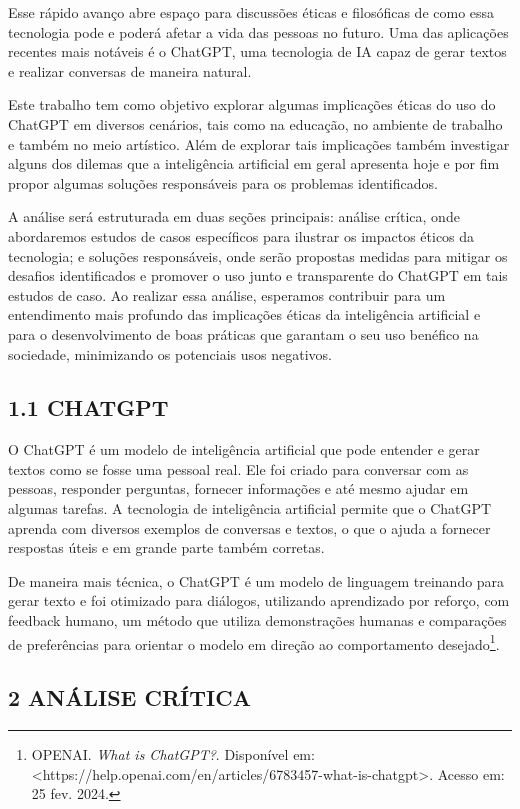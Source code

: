 Esse rápido avanço abre espaço para discussões éticas e filosóficas de como essa tecnologia pode e poderá afetar a vida das pessoas no futuro. Uma das aplicações recentes mais notáveis é o ChatGPT, uma tecnologia de IA capaz de gerar textos e realizar conversas de maneira natural. 

Este trabalho tem como objetivo explorar algumas implicações éticas do uso do ChatGPT em diversos cenários, tais como na educação, no ambiente de trabalho e também no meio artístico. Além de explorar tais implicações também investigar alguns dos dilemas que a inteligência artificial em geral apresenta hoje e por fim propor algumas soluções responsáveis para os problemas identificados.

A análise será estruturada em duas seções principais: análise crítica, onde abordaremos estudos de casos específicos para ilustrar os impactos éticos da tecnologia; e soluções responsáveis, onde serão propostas medidas para mitigar os desafios identificados e promover o uso junto e transparente do ChatGPT em tais estudos de caso. Ao realizar essa análise, esperamos contribuir para um entendimento mais profundo das implicações éticas da inteligência artificial e para o desenvolvimento de boas práticas que garantam o seu uso benéfico na sociedade, minimizando os potenciais usos negativos.

\subsection*{{1.1 CHATGPT}}
O ChatGPT é um modelo de inteligência artificial que pode entender e gerar textos como se fosse uma pessoal real. Ele foi criado para conversar com as pessoas, responder perguntas, fornecer informações e até mesmo ajudar em algumas tarefas. A tecnologia de inteligência artificial permite que o ChatGPT aprenda com diversos exemplos de conversas e textos, o que o ajuda a fornecer respostas úteis e em grande parte também corretas.

De maneira mais técnica, o ChatGPT é um modelo de linguagem treinando para gerar texto e foi otimizado para diálogos, utilizando aprendizado por reforço, com feedback humano, um método que utiliza demonstrações humanas e comparações de preferências para orientar o modelo em direção ao comportamento desejado\footnote{OPENAI. \textit{What is ChatGPT?}. Disponível em: <https://help.openai.com/en/articles/6783457-what-is-chatgpt>. Acesso em: 25 fev. 2024.}.



\subsection*{\textbf{2 ANÁLISE CRÍTICA}}
